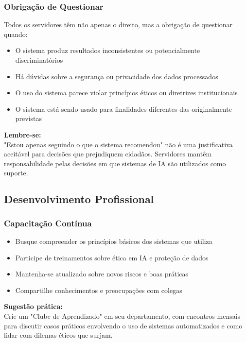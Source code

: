 \documentclass[12pt,a4paper]{article}
\begin{document}
\subsubsection{Obrigação de Questionar}
Todos os servidores têm não apenas o direito, mas a obrigação de questionar quando:

\begin{itemize}
    \item O sistema produz resultados inconsistentes ou potencialmente discriminatórios
    \item Há dúvidas sobre a segurança ou privacidade dos dados processados
    \item O uso do sistema parece violar princípios éticos ou diretrizes institucionais
    \item O sistema está sendo usado para finalidades diferentes das originalmente previstas
\end{itemize}

\begin{tcolorbox}[warning]
\textbf{Lembre-se:} \\
"Estou apenas seguindo o que o sistema recomendou" não é uma justificativa aceitável para decisões que prejudiquem cidadãos. Servidores mantêm responsabilidade pelas decisões em que sistemas de IA são utilizados como suporte.
\end{tcolorbox}

\subsection{Desenvolvimento Profissional}

\subsubsection{Capacitação Contínua}
\begin{itemize}
    \item Busque compreender os princípios básicos dos sistemas que utiliza
    \item Participe de treinamentos sobre ética em IA e proteção de dados
    \item Mantenha-se atualizado sobre novos riscos e boas práticas
    \item Compartilhe conhecimentos e preocupações com colegas
\end{itemize}

\begin{tcolorbox}[highlight]
\textbf{Sugestão prática:} \\
Crie um "Clube de Aprendizado" em seu departamento, com encontros mensais para discutir casos práticos envolvendo o uso de sistemas automatizados e como lidar com dilemas éticos que surjam.
\end{tcolorbox}
\end{document}
